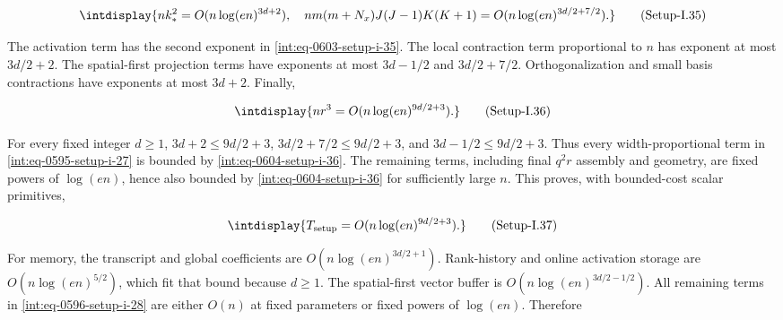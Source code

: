 \label{int:eq-setup-i-35}
\begingroup\renewcommand{\theHequation}{intdisplay.1122}
\begin{equation}
\intdisplay{
nk_*^2=O(n\log(en)^{3d+2}),
\quad
nm(m+N_x)J(J-1)K(K+1)
=O(n\log(en)^{3d/2+7/2}).
}
\tag{Setup-I.35}
\label{int:eq-0603-setup-i-35}
\end{equation}
\endgroup


The activation term has the second exponent in \hyperref[int:eq-setup-i-35]{\eqref{int:eq-0603-setup-i-35}}. The local contraction term proportional to \(n\) has exponent at most \(3d/2+2\). The spatial-first projection terms have exponents at most \(3d-1/2\) and \(3d/2+7/2\). Orthogonalization and small basis contractions have exponents at most \(3d+2\). Finally,


\label{int:eq-setup-i-36}
\begingroup\renewcommand{\theHequation}{intdisplay.1123}
\begin{equation}
\intdisplay{
nr^3=O(n\log(en)^{9d/2+3}).
}
\tag{Setup-I.36}
\label{int:eq-0604-setup-i-36}
\end{equation}
\endgroup


For every fixed integer \(d\ge1\), \(3d+2\le9d/2+3\), \(3d/2+7/2\le9d/2+3\), and \(3d-1/2\le9d/2+3\). Thus every width-proportional term in \hyperref[int:eq-setup-i-27]{\eqref{int:eq-0595-setup-i-27}} is bounded by \hyperref[int:eq-setup-i-36]{\eqref{int:eq-0604-setup-i-36}}. The remaining terms, including final \(q^2r\) assembly and geometry, are fixed powers of \(\log(en)\), hence also bounded by \hyperref[int:eq-setup-i-36]{\eqref{int:eq-0604-setup-i-36}} for sufficiently large \(n\). This proves, with bounded-cost scalar primitives,


\label{int:eq-setup-i-37}
\begingroup\renewcommand{\theHequation}{intdisplay.1124}
\begin{equation}
\intdisplay{
T_{\rm setup}=O(n\log(en)^{9d/2+3}).
}
\tag{Setup-I.37}
\label{int:eq-0605-setup-i-37}
\end{equation}
\endgroup


For memory, the transcript and global coefficients are \(O(n\log(en)^{3d/2+1})\). Rank-history and online activation storage are \(O(n\log(en)^{5/2})\), which fit that bound because \(d\ge1\). The spatial-first vector buffer is \(O(n\log(en)^{3d/2-1/2})\). All remaining terms in \hyperref[int:eq-setup-i-28]{\eqref{int:eq-0596-setup-i-28}} are either \(O(n)\) at fixed parameters or fixed powers of \(\log(en)\). Therefore


